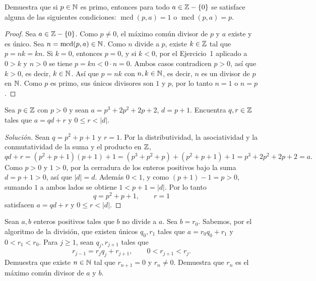 \documentclass[12pt,a4paper]{article}
\begin{document}
    \begin{problema}
        Demuestra que si $p\in\mathbb{N}$ es primo, entonces para todo $a\in\mathbb{Z}-\{0\}$ se satisface alguna de las siguientes
        condiciones: $\operatorname{mcd}(p,a)=1$ o $\operatorname{mcd}(p,a)=p$.
    \end{problema}

    \begin{proof}
        Sea $a\in\mathbb{Z}-\{0\}$. Como $p\neq0$, el máximo común divisor de $p$ y $a$ existe y es único. Sea
        $n=\operatorname{mcd}(p,a)\in\mathbb{N}$. Como $n$ divide a $p$, existe $k\in\mathbb{Z}$ tal que $p=nk=kn$. Si $k=0$, entonces $p=0$, y si $k<0$,
        por el Ejercicio~1 aplicado a $0>k$ y $n>0$ se tiene $p=kn<0\cdot n=0$. Ambos casos contradicen $p>0$, así
        que $k>0$, es decir, $k\in\mathbb{N}$. Así que $p=nk$ con $n,k\in\mathbb{N}$, es
        decir, $n$ es un divisor de $p$ en $\mathbb{N}$. Como $p$ es primo, sus únicos divisores son $1$ y $p$, por lo
        tanto $n=1$ o $n=p$.
    \end{proof}

    \begin{problema}
        Sea $p\in\mathbb{Z}$ con $p>0$ y sean $a=p^3+2p^2+2p+2$, $d=p+1$. Encuentra $q,r\in\mathbb{Z}$ tales que $a=qd+r$ y
        $0\le r<|d|$.
    \end{problema}

    \begin{proof}[Solución]
        Sean $q=p^2+p+1$ y $r=1$. Por la distributividad, la asociatividad y la conmutatividad de la suma y el
        producto en $\mathbb{Z}$,
        \begin{equation*}
            qd+r=(p^2+p+1)(p+1)+1=(p^3+p^2+p)+(p^2+p+1)+1=p^3+2p^2+2p+2=a.
        \end{equation*}
        Como $p>0$ y $1>0$, por la cerradura de los enteros positivos bajo la suma $d=p+1>0$, así que $|d|=d$. Además
        $0<1$, y como $(p+1)-1=p>0$, sumando $1$ a ambos lados se obtiene $1<p+1=|d|$. Por lo tanto
        \begin{equation*}
            q=p^2+p+1, \qquad r=1
        \end{equation*}
        satisfacen $a=qd+r$ y $0\le r<|d|$.
    \end{proof}

    \begin{problema}
        Sean $a,b$ enteros positivos tales que $b$ no divide a $a$. Sea $b=r_0$. Sabemos, por el algoritmo de la
        división, que existen únicos $q_0,r_1$ tales que $a=r_0q_0+r_1$ y $0<r_1<r_0$. Para $j\ge1$, sean
        $q_j,r_{j+1}$ tales que
        \begin{equation*}
            r_{j-1}=r_jq_j+r_{j+1}, \qquad 0<r_{j+1}<r_j.
        \end{equation*}
        Demuestra que existe $n\in\mathbb{N}$ tal que $r_{n+1}=0$ y $r_n\neq0$. Demuestra que $r_n$ es el máximo común
        divisor de $a$ y $b$.
    \end{problema}
\end{document}
